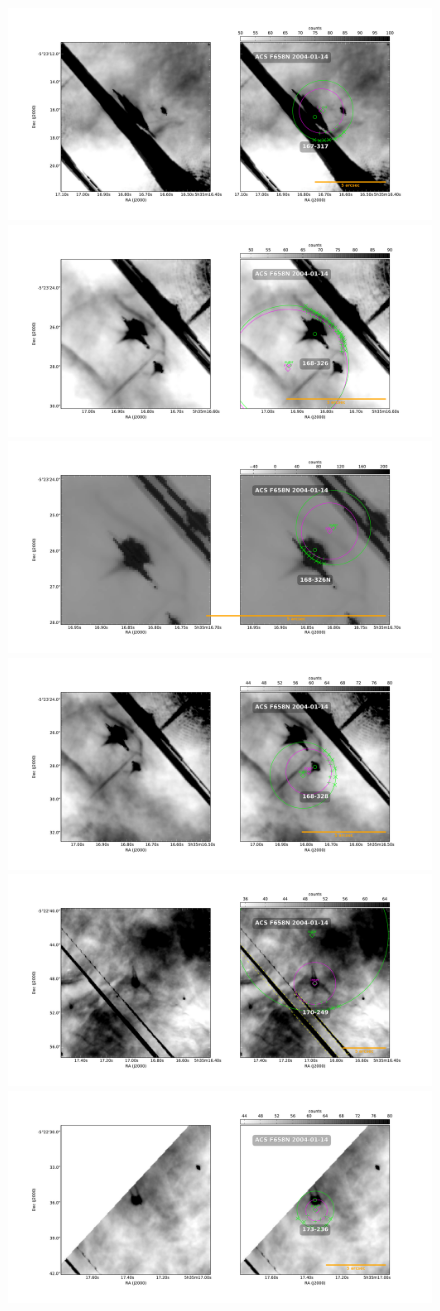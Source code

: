 \documentclass{article}
\begin{document}
\begin{figure}
  \centering
   \includegraphics[width=0.5\linewidth]{j8oc01010_wcs/167-317-Bally_01-images.pdf}
   \includegraphics[width=0.5\linewidth]{j8oc01010_wcs/168-326-Bally_01-images.pdf}
   \includegraphics[width=0.5\linewidth]{j8oc01010_wcs/168-326N-Bally_01-images.pdf}
   \includegraphics[width=0.5\linewidth]{j8oc01010_wcs/168-328-Bally_01-images.pdf}
   \includegraphics[width=0.5\linewidth]{j8oc01010_wcs/170-249-Bally_01-images.pdf}
   \includegraphics[width=0.5\linewidth]{j8oc01010_wcs/173-236-Bally_01-images.pdf}
  \label{fig:images}
\end{figure}
\end{document}
